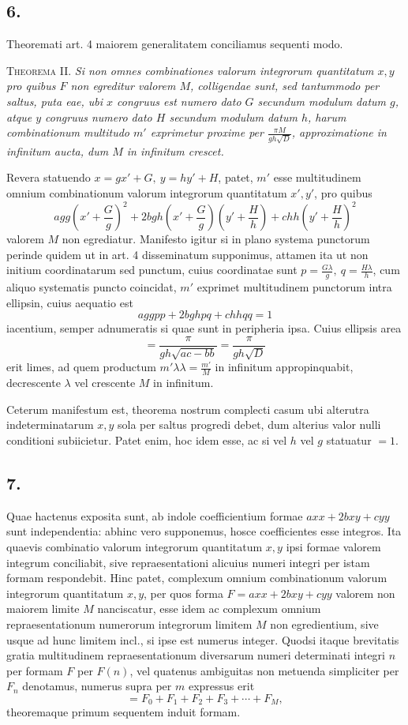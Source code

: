 \documentclass[12pt]{article}
\begin{document}
\subsection*{6.}

Theoremati art. 4 maiorem generalitatem conciliamus sequenti modo.

\textsc{Theorema II.} \emph{Si non omnes combinationes valorum integrorum quantitatum $x,y$ pro quibus $F$ non egreditur valorem $M$, colligendae sunt, sed tantummodo per saltus, puta eae, ubi $x$ congruus est numero dato $G$ secundum modulum datum $g$, atque $y$ congruus numero dato $H$ secundum modulum datum $h$, harum combinationum multitudo $m'$ exprimetur proxime per $\frac{\pi M}{gh\sqrt D}$, approximatione in infinitum aucta, dum $M$ in infinitum crescet.}

Revera statuendo $x=gx'+G,\ y=hy'+H$, patet, $m'$ esse multitudinem omnium combinationum valorum integrorum quantitatum $x',y'$, pro quibus
\[
agg\left(x'+\frac{G}{g}\right)^2+2bgh\left(x'+\frac{G}{g}\right)\left(y'+\frac{H}{h}\right)+chh\left(y'+\frac{H}{h}\right)^2
\]
valorem $M$ non egrediatur. Manifesto igitur si in plano systema punctorum perinde quidem ut in art. 4 disseminatum supponimus, attamen ita ut non initium coordinatarum sed punctum, cuius coordinatae sunt $p=\frac{G\lambda}{g},\ q=\frac{H\lambda}{h}$, cum aliquo systematis puncto coincidat, $m'$ exprimet multitudinem punctorum intra ellipsin, cuius aequatio est
\[
aggpp+2bghpq+chhqq=1
\]
iacentium, semper adnumeratis si quae sunt in peripheria ipsa. Cuius ellipsis area
\[
=\frac{\pi}{gh\sqrt{ac-bb}}=\frac{\pi}{gh\sqrt D}
\]
erit limes, ad quem productum $m'\lambda\lambda=\frac{m'}{M}$ in infinitum appropinquabit, decrescente $\lambda$ vel crescente $M$ in infinitum.

Ceterum manifestum est, theorema nostrum complecti casum ubi alterutra indeterminatarum $x,y$ sola per saltus progredi debet, dum alterius valor nulli conditioni subiicietur. Patet enim, hoc idem esse, ac si vel $h$ vel $g$ statuatur $=1$.

\subsection*{7.}

Quae hactenus exposita sunt, ab indole coefficientium formae $axx+2bxy+cyy$ sunt independentia: abhinc vero supponemus, hosce coefficientes esse integros. Ita quaevis combinatio valorum integrorum quantitatum $x,y$ ipsi formae valorem integrum conciliabit, sive repraesentationi alicuius numeri integri per istam formam respondebit. Hinc patet, complexum omnium combinationum valorum integrorum quantitatum $x,y$, per quos forma $F=axx+2bxy+cyy$ valorem non maiorem limite $M$ nanciscatur, esse idem ac complexum omnium repraesentationum numerorum integrorum limitem $M$ non egredientium, sive usque ad hunc limitem incl., si ipse est numerus integer. Quodsi itaque brevitatis gratia multitudinem repraesentationum diversarum numeri determinati integri $n$ per formam $F$ per $F(n)$, vel quatenus ambiguitas non metuenda simpliciter per $F_n$ denotamus, numerus supra per $m$ expressus erit
\[
=F_0+F_1+F_2+F_3+\cdots+F_M,
\]
theoremaque primum sequentem induit formam.
\end{document}
